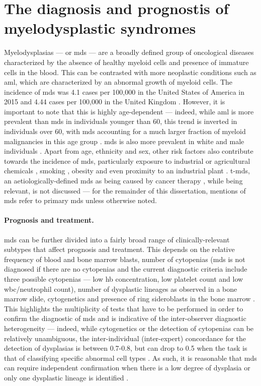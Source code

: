 \section{The diagnosis and prognostis of myelodysplastic syndromes}

Myelodysplasias --- or \ac{mds} --- are a broadly defined group of oncological diseases characterized by the absence of healthy myeloid cells and presence of immature cells in the blood. This can be contrasted with more neoplastic conditions such as \ac{aml}, which are characterized by an abnormal growth of myeloid cells. The incidence of \ac{mds} was 4.1 cases per 100,000 in the United States of America in 2015 \cite{Zeidan2019-jj} and 4.44 cases per 100,000 in the United Kingdom \cite{Roman2016-ad}. However, it is important to note that this is highly age-dependent --- indeed, while \ac{aml} is more prevalent than \ac{mds} in individuals younger than 60, this trend is inverted in individuals over 60, with \ac{mds} accounting for a much larger fraction of myeloid malignancies in this age group \cite{Zeidan2019-jj}. \ac{mds} is also more prevalent in white and male individuals \cite{Zeidan2019-jj}. Apart from age, ethnicity and sex, other risk factors also contribute towards the incidence of \ac{mds}, particularly exposure to industrial or agricultural chemicals \cite{Nisse2001-qf,Lv2011-iv,Strom2005-pq}, smoking \cite{Lv2011-iv,Strom2005-pq}, obesity \cite{Ma2009-ws} and even proximity to an industrial plant \cite{Nisse2001-qf}. \Ac{t-mds}, an aetiologically-defined \ac{mds} as being caused by cancer therapy \cite{Kuendgen2021-in}, while being relevant, is not discussed --- for the remainder of this dissertation, mentions of \ac{mds} refer to primary \ac{mds} unless otherwise noted.

\paragraph{Prognosis and treatment.} \Ac{mds} can be further divided into a fairly broad range of clinically-relevant subtypes that affect prognosis and treatment. This depends on the relative frequency of blood and bone marrow blasts, number of cytopenias (\ac{mds} is not diagnosed if there are no cytopenias and the current diagnostic criteria include three possible cytopenias --- low \ac{hb} concentration, low platelet count and low \ac{wbc}/neutrophil count), number of dysplastic lineages as observed in a bone marrow slide, cytogenetics and presence of ring sideroblasts in the bone marrow \cite{Arber2016-os}. This highlights the multiplicity of tests that have to be performed in order to confirm the diagnostic of \ac{mds} and is indicative of the inter-observer diagnostic heterogeneity --- indeed, while cytogenetics or the detection of cytopenias can be relatively unambiguous, the inter-individual (inter-expert) concordance for the detection of dysplasias is between 0.7-0.8, but can drop to 0.5 when the task is that of classifying specific abnormal cell types \cite{Font2013-lx, Parmentier2012-wm, Della_Porta2015-hw}. As such, it is reasonable that \ac{mds} can require independent confirmation when there is a low degree of dysplasia or only one dysplastic lineage is identified \cite{Arber2016-os}.

